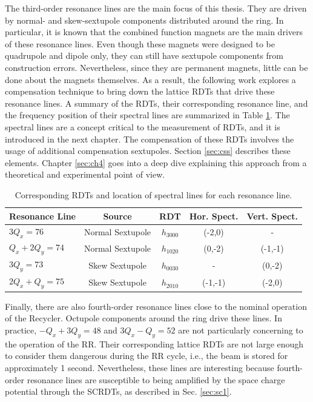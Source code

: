 The third-order resonance lines are the main focus of this thesis. They are driven by normal- and skew-sextupole components distributed around the ring. In particular, it is known that the combined function magnets are the main drivers of these resonance lines. Even though these magnets were designed to be quadrupole and dipole only, they can still have sextupole components from construction errors. Nevertheless, since they are permanent magnets, little can be done about the magnets themselves. As a result, the following work explores a compensation technique to bring down the lattice RDTs that drive these resonance lines. A summary of the RDTs, their corresponding resonance line, and the frequency position of their spectral lines are summarized in Table \ref{tab:rdtlines}. The spectral lines are a concept critical to the measurement of RDTs, and it is introduced in the next chapter. The compensation of these RDTs involves the usage of additional compensation sextupoles. Section \ref{sec:css} describes these elements. Chapter \ref{sec:ch4} goes into a deep dive explaining this approach from a theoretical and experimental point of view. 

\begin{table}[H]
   \centering
   \caption{Corresponding RDTs and location of spectral lines for each resonance line.}
   \begin{tabular}{lcccc}
       \toprule
       \textbf{Resonance Line} & \textbf{Source} & \textbf{RDT} & \textbf{Hor. Spect.} & \textbf{Vert. Spect.} \\
       \midrule
           $3Q_x=76$     & Normal Sextupole    & $h_{3000}$           &  (-2,0)  & -       \\ %
          $Q_x+2Q_y=74$   & Normal Sextupole    & $h_{1020}$            & (0,-2) & (-1,-1)       \\ %
           $3Q_y=73$     & Skew Sextupole   & $h_{0030}$           & - & (0,-2)        \\ %
           $2Q_x+Q_y=75$   & Skew Sextupole    & $h_{2010}$     & (-1,-1) & (-2,0)       \\
       \bottomrule
   \end{tabular}
   \label{tab:rdtlines}
\end{table}

Finally, there are also fourth-order resonance lines close to the nominal operation of the Recycler. Octupole components around the ring drive these lines. In practice, $-Q_x+3Q_y = 48$ and $3Q_x-Q_y = 52$ are not particularly concerning to the operation of the RR. Their corresponding lattice RDTs are not large enough to consider them dangerous during the RR cycle, i.e., the beam is stored for approximately 1 second. Nevertheless, these lines are interesting because fourth-order resonance lines are susceptible to being amplified by the space charge potential through the SCRDTs, as described in Sec. \ref{sec:sc1}.    

